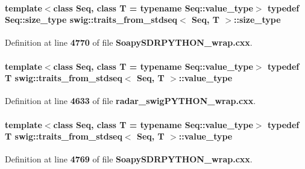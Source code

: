 \paragraph[{size\+\_\+type}]{\setlength{\rightskip}{0pt plus 5cm}template$<$class Seq, class T = typename Seq\+::value\+\_\+type$>$ typedef Seq\+::size\+\_\+type {\bf swig\+::traits\+\_\+from\+\_\+stdseq}$<$ Seq, T $>$\+::{\bf size\+\_\+type}}\label{structswig_1_1traits__from__stdseq_a1189d4a7cea9e522a7c10ed7ff2ce232}


Definition at line {\bf 4770} of file {\bf Soapy\+S\+D\+R\+P\+Y\+T\+H\+O\+N\+\_\+wrap.\+cxx}.

\paragraph[{value\+\_\+type}]{\setlength{\rightskip}{0pt plus 5cm}template$<$class Seq, class T = typename Seq\+::value\+\_\+type$>$ typedef T {\bf swig\+::traits\+\_\+from\+\_\+stdseq}$<$ Seq, T $>$\+::{\bf value\+\_\+type}}\label{structswig_1_1traits__from__stdseq_a2159701c1eaadbf75d9b3014fea48706}


Definition at line {\bf 4633} of file {\bf radar\+\_\+swig\+P\+Y\+T\+H\+O\+N\+\_\+wrap.\+cxx}.

\paragraph[{value\+\_\+type}]{\setlength{\rightskip}{0pt plus 5cm}template$<$class Seq, class T = typename Seq\+::value\+\_\+type$>$ typedef T {\bf swig\+::traits\+\_\+from\+\_\+stdseq}$<$ Seq, T $>$\+::{\bf value\+\_\+type}}\label{structswig_1_1traits__from__stdseq_a2159701c1eaadbf75d9b3014fea48706}


Definition at line {\bf 4769} of file {\bf Soapy\+S\+D\+R\+P\+Y\+T\+H\+O\+N\+\_\+wrap.\+cxx}.



